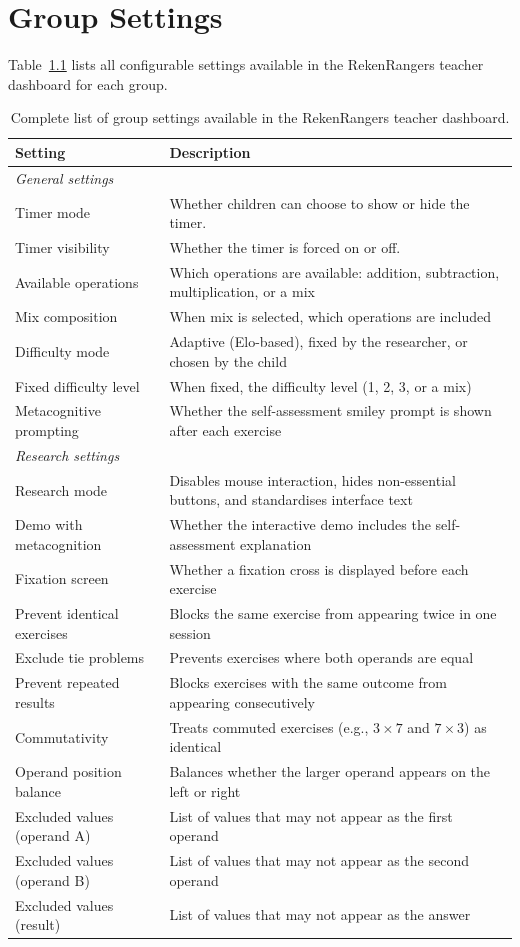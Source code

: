 \chapter{Group Settings}
\label{app:group-settings}

Table~\ref{tab:group-settings} lists all configurable settings available in the RekenRangers teacher dashboard for each group.

\begin{table}[ht]
\centering
\begin{tabular}{lp{8.5cm}}
\toprule
Setting & Description \\
\midrule
\multicolumn{2}{l}{\textit{General settings}} \\
\midrule
Timer mode & Whether children can choose to show or hide the timer. \\
Timer visibility & Whether the timer is forced on or off. \\
Available operations & Which operations are available: addition, subtraction, multiplication, or a mix \\
Mix composition & When mix is selected, which operations are included \\
Difficulty mode & Adaptive (Elo-based), fixed by the researcher, or chosen by the child \\
Fixed difficulty level & When fixed, the difficulty level (1, 2, 3, or a mix) \\
Metacognitive prompting & Whether the self-assessment smiley prompt is shown after each exercise \\
\midrule
\multicolumn{2}{l}{\textit{Research settings}} \\
\midrule
Research mode & Disables mouse interaction, hides non-essential buttons, and standardises interface text \\
Demo with metacognition & Whether the interactive demo includes the self-assessment explanation \\
Fixation screen & Whether a fixation cross is displayed before each exercise \\
Prevent identical exercises & Blocks the same exercise from appearing twice in one session \\
Exclude tie problems & Prevents exercises where both operands are equal \\
Prevent repeated results & Blocks exercises with the same outcome from appearing consecutively \\
Commutativity & Treats commuted exercises (e.g., $3 \times 7$ and $7 \times 3$) as identical \\
Operand position balance & Balances whether the larger operand appears on the left or right \\
Excluded values (operand A) & List of values that may not appear as the first operand \\
Excluded values (operand B) & List of values that may not appear as the second operand \\
Excluded values (result) & List of values that may not appear as the answer \\
\bottomrule
\end{tabular}
\caption{Complete list of group settings available in the RekenRangers teacher dashboard.}
\label{tab:group-settings}
\end{table}